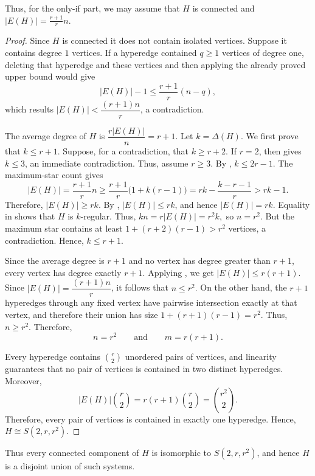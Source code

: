\documentclass[11pt,a4paper]{article}
\newtheorem{lemma}[theorem]{Lemma}
\theoremstyle{definition}
\theoremstyle{remark}
\begin{document}
Thus, for the only-if part, we may assume that $H$ is connected and $|E(H)|=\frac{r+1}{r}n.$


\begin{proof}

Since $H$ is connected it does not contain isolated vertices. Suppose it contains degree $1$ vertices. If a hyperedge contained $q\geq 1$
vertices of degree one, deleting that hyperedge and these vertices and
then applying the already proved upper bound would give
$$
|E(H)|-1\leq\frac{r+1}{r}(n-q),
$$
which results $|E(H)| < \dfrac{(r+1)n}{r}$, a contradiction.

The average degree of $H$ is $
\dfrac{r|E(H)|}{n}=r+1.$ Let $k = \Delta(H)$.
We first prove that $k\leq r+1$. Suppose, for a contradiction, that
$k\geq r+2$. If $r=2$, then  gives
$k\leq 3$, an immediate contradiction. Thus, assume $r\geq 3$. By
, $k\leq 2r-1$. The maximum-star count
gives
$$
|E(H)|
=\frac{r+1}{r}n
\geq
\frac{r+1}{r}\bigl(1+k(r-1)\bigr)
=
rk-\frac{k-r-1}{r}
>
rk-1.
$$
Therefore, $|E(H)|\geq rk$. By , $|E(H)|\leq rk$, and
hence $|E(H)|=rk$. Equality in  shows that $H$ is
$k$-regular. Thus, $
kn=r|E(H)|=r^2k,$ so $n=r^2$. But the maximum star contains at least $1+(r+2)(r-1)>r^2$ vertices, a contradiction. Hence, $k\leq r+1$.

Since the average degree is $r+1$ and no vertex has degree greater than
$r+1$, every vertex has degree exactly $r+1$. Applying
, we get $
|E(H)|\leq r(r+1).$
Since $|E(H)|=\dfrac{(r+1)n}{r}$, it follows that $n\leq r^2.$
On the other hand, the $r+1$ hyperedges through any fixed vertex have
pairwise intersection exactly at that vertex, and therefore their union
has size $1+(r+1)(r-1)=r^2.$
Thus, $n\geq r^2$. Therefore,
$$
n=r^2
\qquad\text{and}\qquad
m=r(r+1).
$$

Every hyperedge contains $\binom{r}{2}$ unordered pairs of vertices,
and linearity guarantees that no pair of vertices is contained in two
distinct hyperedges. Moreover,
$$
|E(H)|\binom{r}{2}
=
r(r+1)\binom{r}{2}
=
\binom{r^2}{2}.
$$
Therefore, every pair of vertices is contained in exactly one
hyperedge. Hence, $H\cong S(2,r,r^2)$.
\end{proof}
Thus every connected component of $H$ is isomorphic to
$S(2,r,r^2)$, and hence $H$ is a disjoint union of such systems.
\end{document}
